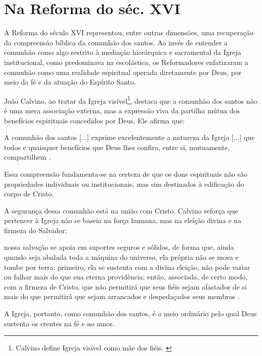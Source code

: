 \section{Na Reforma do séc. XVI}

A Reforma do século XVI representou, entre outras dimensões, uma recuperação da compreensão bíblica da comunhão dos santos. Ao invés de entender a comunhão como algo restrito à mediação hierárquica e sacramental da Igreja institucional, como predominava na escolástica, os Reformadores enfatizaram a comunhão como uma realidade espiritual operada diretamente por Deus, por meio da fé e da atuação do Espírito Santo.

João Calvino, ao tratar da Igreja visível\footnote{Calvino define Igreja visível como mãe dos fiéis. \cite[v.~4, p.~1865]{calvino2022}}, destaca que a comunhão dos santos não é uma mera associação externa, mas a expressão viva da partilha mútua dos benefícios espirituais concedidos por Deus. Ele afirma que:

\begin{citacao}
    A comunhão dos santos [...] exprime excelentemente a natureza da Igreja [...] que todos e quaisquer benefícios que Deus lhes confira, entre si, mutuamente, compartilhem \cite[v.~4, p.~1863]{calvino2022}.
\end{citacao}

Essa compreensão fundamenta-se na certeza de que os dons espirituais não são propriedades individuais ou institucionais, mas sim destinados à edificação do corpo de Cristo.

A segurança dessa comunhão está na união com Cristo. Calvino reforça que pertencer à Igreja não se baseia na força humana, mas na eleição divina e na firmeza do Salvador:

\begin{citacao}
    nossa salvação se apoia em suportes seguros e sólidos, de forma que, ainda quando seja abalada toda a máquina do universo, ela própria não se mova e tombe por terra: primeiro, ela se sustenta com a divina eleição, não pode variar ou falhar mais do que sua eterna providência; então, associada, de certo modo, com a firmeza de Cristo, que não permitirá que seus fiéis sejam afastados de si mais do que permitirá que sejam arrancados e despedaçados seus membros \cite[v.~4, pp.~1863-1864]{calvino2022}.
\end{citacao}

A Igreja, portanto, como comunhão dos santos, é o meio ordinário pelo qual Deus sustenta os crentes na fé e no amor.

